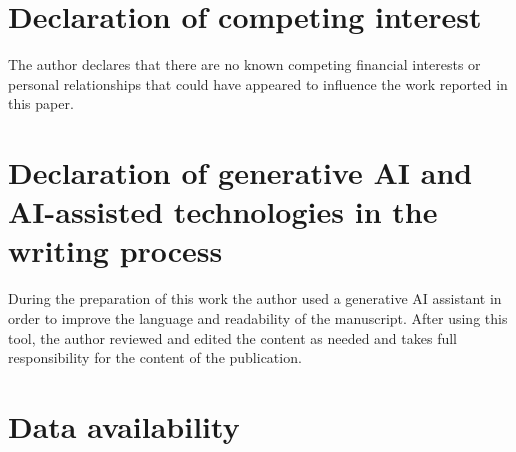 \documentclass[review,12pt]{elsarticle}
\theoremstyle{plain}
\theoremstyle{definition}
\theoremstyle{remark}
\begin{document}
\section*{Declaration of competing interest}

The author declares that there are no known competing financial interests or personal relationships that could have appeared to influence the work reported in this paper.

\section*{Declaration of generative AI and AI-assisted technologies in the writing process}

During the preparation of this work the author used a generative AI assistant in order to improve the language and readability of the manuscript. After using this tool, the author reviewed and edited the content as needed and takes full responsibility for the content of the publication.

\section*{Data availability}
\end{document}
